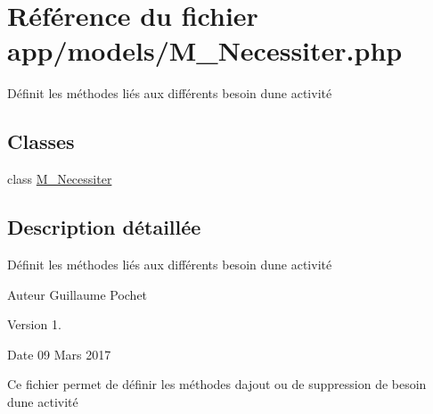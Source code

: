 \hypertarget{_m___necessiter_8php}{}\section{Référence du fichier app/models/\+M\+\_\+\+Necessiter.php}
\label{_m___necessiter_8php}


Définit les méthodes liés aux différents besoin d\textquotesingle{}une activité  


\subsection*{Classes}
\begin{DoxyCompactItemize}
\item 
class \hyperlink{class_m___necessiter}{M\+\_\+\+Necessiter}
\end{DoxyCompactItemize}


\subsection{Description détaillée}
Définit les méthodes liés aux différents besoin d\textquotesingle{}une activité 

\begin{DoxyAuthor}{Auteur}
Guillaume Pochet 
\end{DoxyAuthor}
\begin{DoxyVersion}{Version}
1. 
\end{DoxyVersion}
\begin{DoxyDate}{Date}
09 Mars 2017
\end{DoxyDate}
Ce fichier permet de définir les méthodes d\textquotesingle{}ajout ou de suppression de besoin d\textquotesingle{}une activité 